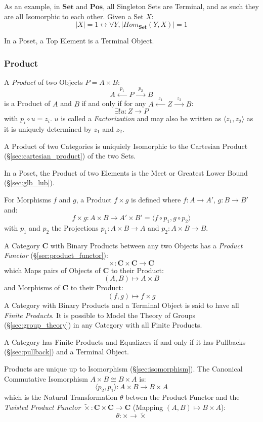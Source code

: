 As an example, in $\mathbf{Set}$ and $\mathbf{Pos}$, all Singleton
Sets are Terminal, and as such they are all Isomorphic to each other.
Given a Set $X$:
\[
  |X| = 1 \leftrightarrow \forall Y, |Hom_{\mathbf{Set}}(Y,X)| = 1
\]

In a Poset, a Top Element is a Terminal Object.



\subsubsection{Product}\label{sec:product}

A \emph{Product} of two Objects $P = A \times B$:
\[
  A \xleftarrow{\;\;p_1\;\;} P \xrightarrow{\;\;p_2\;\;} B
\]
is a Product of $A$ and $B$ if and only if for any $A
\xleftarrow{\;\;z_1\;\;} Z \xrightarrow{\;\;z_2\;\;} B$:
\[
  \exists!u : Z \rightarrow P
\]
with $p_i \circ u = z_i$. $u$ is called a \emph{Factorization} and may
also be written as $\langle z_1, z_2 \rangle$ as it is uniquely
determined by $z_1$ and $z_2$.

A Product of two Categories is uniquiely Isomorphic to the Cartesian
Product (\S\ref{sec:cartesian_product}) of the two Sets.

In a Poset, the Product of two Elements is the Meet or Greatest Lower
Bound (\S\ref{sec:glb_lub}).

For Morphisms $f$ and $g$, a Product $f \times g$ is defined where $f
: A \rightarrow A'$, $g : B \rightarrow B'$ and:
\[
  f \times g : A \times B \rightarrow A' \times B' =
  \langle f \circ p_1, g \circ p_2 \rangle
\]
with $p_1$ and $p_2$ the Projections $p_1 : A \times B \rightarrow A$
and $p_2 : A \times B \rightarrow B$.

A Category $\mathbf{C}$ with Binary Products between any two Objects
has a \emph{Product Functor} (\S\ref{sec:product_functor}):
\[
  \times : \mathbf{C} \times \mathbf{C} \rightarrow \mathbf{C}
\]
which Maps pairs of Objects of $\mathbf{C}$ to their Product:
\[
  (A,B) \mapsto A \times B
\]
and Morphisms of $\mathbf{C}$ to their Product:
\[
  (f,g) \mapsto f \times g
\]
A Category with Binary Products and a Terminal Object is said to have
all \emph{Finite Products}. It is possible to Model the Theory of
Groups (\S\ref{sec:group_theory}) in any Category with all Finite
Products.

A Category has Finite Products and Equalizers if and only if it has
Pullbacks (\S\ref{sec:pullback}) and a Terminal Object. \cite{awodey06}

Products are unique up to Isomorphism (\S\ref{sec:isomorphism}). The
Canonical Commutative Isomorphism $A \times B \cong B \times A$ is:
\[
  \langle p_2, p_1 \rangle : A \times B \rightarrow B \times A
\]
which is the Natural Transformation $\theta$ betwen the Product
Functor and the \emph{Twisted Product Functor} $\tilde{\times} :
\mathbf{C} \times \mathbf{C} \rightarrow \mathbf{C}$ (Mapping $(A,B)
\mapsto B \times A$):
\[
  \theta : \times \rightarrow \tilde{\times}
\]

